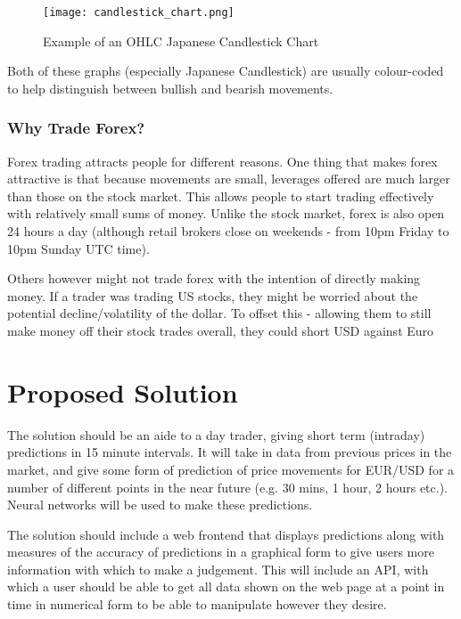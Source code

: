             \begin{figure}[h]
                \centering
                \texttt{[image: candlestick\_chart.png]}
                \caption{Example of an OHLC Japanese Candlestick Chart \cite{candlestick_OHLC}}
                \label{fig:candlestick_ex}
            \end{figure}

            Both of these graphs (especially Japanese Candlestick) are usually colour-coded to help distinguish between bullish and bearish movements.
        


            \subsubsection{Why Trade Forex?}
            Forex trading attracts people for different reasons. One thing that makes forex attractive is that because movements are small, leverages offered are much larger than those on the stock market. This allows people to start trading effectively with relatively small sums of money. Unlike the stock market, forex is also open 24 hours a day (although retail brokers close on weekends - from 10pm Friday to 10pm Sunday UTC time).

            Others however might not trade forex with the intention of directly making money. If a trader was trading US stocks, they might be worried about the potential decline/volatility of the dollar. To offset this - allowing them to still make money off their stock trades overall, they could short USD against Euro\cite{investopedia_beginner}



    \section{Proposed Solution}

    The solution should be an aide to a day trader, giving short term (intraday) predictions in 15 minute intervals. It will take in data from previous prices in the market, and give some form of prediction of price movements for EUR/USD for a number of different points in the near future (e.g. 30 mins, 1 hour, 2 hours etc.). Neural networks will be used to make these predictions.

    The solution should include a web frontend that displays predictions along with measures of the accuracy of predictions in a graphical form to give users more information with which to make a judgement. This will include an API, with which a user should be able to get all data shown on the web page at a point in time in numerical form to be able to manipulate however they desire.

